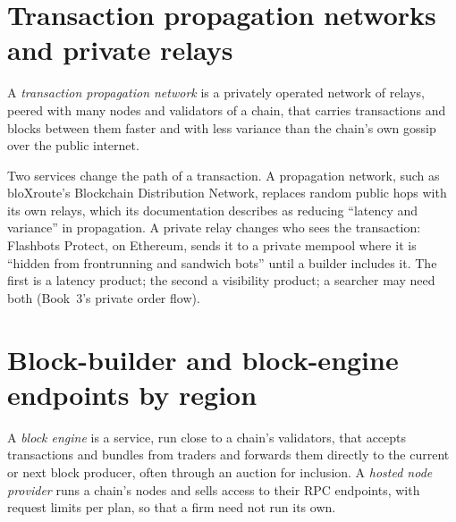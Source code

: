 \section{Transaction propagation networks and private relays}

\begin{definition}\label{def:nw:on-chain-connectivity:tpn}
A \emph{transaction propagation network} is a privately operated network of relays, peered with many nodes
and validators of a chain, that carries transactions and blocks between them faster and with less variance than the chain's own gossip over the
public internet.
\end{definition}

Two services change the path of a transaction. A propagation network, such as bloXroute's Blockchain Distribution Network, replaces random public
hops with its own relays, which its documentation describes as reducing ``latency and variance'' in propagation. A private relay changes who sees
the transaction: Flashbots Protect, on Ethereum, sends it to a private mempool where it is ``hidden from frontrunning and sandwich bots'' until a
builder includes it. The first is a latency product; the second a visibility product; a searcher may need both (Book~3's private order flow).

\section{Block-builder and block-engine endpoints by region}

\begin{definition}\label{def:nw:on-chain-connectivity:engine}
A \emph{block engine} is a service, run close to a chain's validators, that accepts transactions and bundles from traders and
forwards them directly to the current or next block producer, often through an auction for inclusion. A \emph{hosted node provider} runs a chain's nodes and sells access to their RPC endpoints, with request limits per plan, so that a firm need not run its own.
\end{definition}

